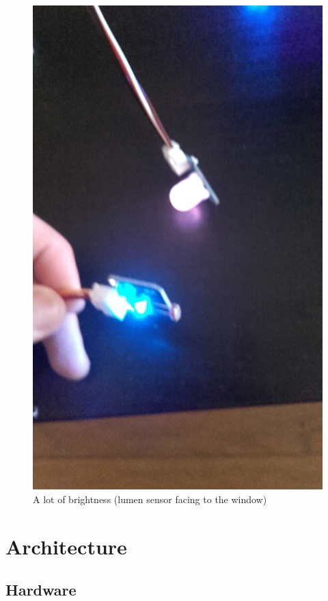 \documentclass[10pt]{article}
\begin{document}
\begin{figure}[H]
  \centering
  \includegraphics[width=\textwidth]{../imgs/lotOfBrightness2.jpg}
  \caption{\label{lotOfBrightness}A lot of brightness (lumen sensor facing to the window)}
\end{figure}


\section{Architecture}

\subsection{Hardware}
\end{document}
